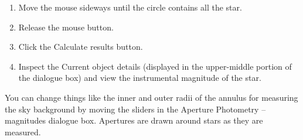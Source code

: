 \documentclass[twoside,11pt]{article}
\begin{document}
\begin{enumerate}
\begin{enumerate}
     \item Move the mouse sideways until the circle contains all the star.

     \item Release the mouse button.

     \item Click the {\sf Calculate results} button.

     \item Inspect the {\sf Current object details} (displayed in the
      upper-middle portion of the dialogue box) and view the instrumental
      magnitude of the star.

  \end{enumerate}

   You can change things like the inner and outer radii of the annulus for
   measuring the sky background by moving the sliders in the {\sf Aperture
   Photometry -- magnitudes} dialogue box.  Apertures are drawn around
   stars as they are measured.


\end{enumerate}
\end{document}
